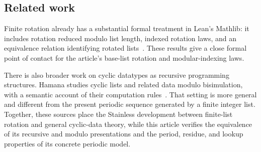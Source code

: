 \subsection{Related work}

Finite rotation already has a substantial formal treatment in Lean's Mathlib:
it includes rotation reduced modulo list length, indexed rotation laws, and an
equivalence relation identifying rotated lists~\cite{leanmathlibrotate}. These
results give a close formal point of contact for the article's base-list
rotation and modular-indexing laws.

There is also broader work on cyclic datatypes as recursive programming
structures. Hamana studies cyclic lists and related data modulo bisimulation,
with a semantic account of their computation rules~\cite{hamana2017cyclic}.
That setting is more general and different from the present periodic sequence
generated by a finite integer list. Together, these sources place the Stainless
development between finite-list rotation and general cyclic-data theory, while
this article verifies the equivalence of its recursive and modulo presentations
and the period, residue, and lookup properties of its concrete periodic model.
